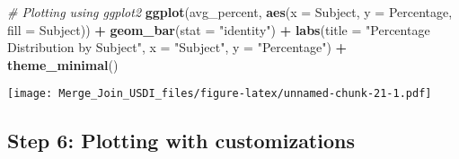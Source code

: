 \documentclass[
]{article}
\newenvironment{Shaded}{\begin{snugshade}}{\end{snugshade}}
\newcommand{\AttributeTok}[1]{\textcolor[rgb]{0.13,0.29,0.53}{#1}}
\newcommand{\CommentTok}[1]{\textcolor[rgb]{0.56,0.35,0.01}{\textit{#1}}}
\newcommand{\FunctionTok}[1]{\textcolor[rgb]{0.13,0.29,0.53}{\textbf{#1}}}
\newcommand{\NormalTok}[1]{#1}
\newcommand{\SpecialCharTok}[1]{\textcolor[rgb]{0.81,0.36,0.00}{\textbf{#1}}}
\newcommand{\StringTok}[1]{\textcolor[rgb]{0.31,0.60,0.02}{#1}}
\begin{document}
\begin{Shaded}
\begin{Highlighting}[]
\CommentTok{\# Plotting using ggplot2}
\FunctionTok{ggplot}\NormalTok{(avg\_percent, }\FunctionTok{aes}\NormalTok{(}\AttributeTok{x =}\NormalTok{ Subject, }\AttributeTok{y =}\NormalTok{ Percentage, }\AttributeTok{fill =}\NormalTok{ Subject)) }\SpecialCharTok{+}
  \FunctionTok{geom\_bar}\NormalTok{(}\AttributeTok{stat =} \StringTok{"identity"}\NormalTok{) }\SpecialCharTok{+}
  \FunctionTok{labs}\NormalTok{(}\AttributeTok{title =} \StringTok{"Percentage Distribution by Subject"}\NormalTok{,}
       \AttributeTok{x =} \StringTok{"Subject"}\NormalTok{, }\AttributeTok{y =} \StringTok{"Percentage"}\NormalTok{) }\SpecialCharTok{+}
  \FunctionTok{theme\_minimal}\NormalTok{()}
\end{Highlighting}
\end{Shaded}

\texttt{[image: Merge\_Join\_USDI\_files/figure-latex/unnamed-chunk-21-1.pdf]}

\hypertarget{step-6-plotting-with-customizations}{%
\subsection{Step 6: Plotting with
customizations}\label{step-6-plotting-with-customizations}}
\end{document}
